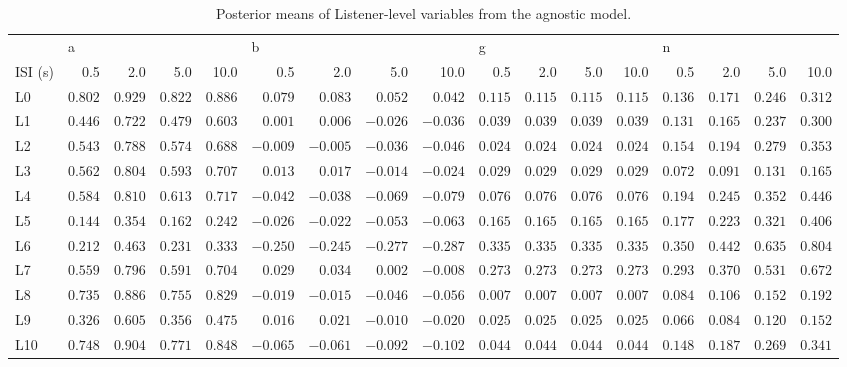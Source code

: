 \begin{table} \centering \caption{Posterior means of Listener-level variables from the agnostic model.} \label{vars} \begin{tabular}{lrrrrrrrrrrrrrrrr} \toprule {} & \multicolumn{4}{l}{a} & \multicolumn{4}{l}{b} & \multicolumn{4}{l}{g} & \multicolumn{4}{l}{n} \\ ISI (s) & 0.5 & 2.0 & 5.0 & 10.0 & 0.5 & 2.0 & 5.0 & 10.0 & 0.5 & 2.0 & 5.0 & 10.0 & 0.5 & 2.0 & 5.0 & 10.0 \\ \midrule L0 & $0.802$ & $0.929$ & $0.822$ & $0.886$ & $0.079$ & $0.083$ & $0.052$ & $0.042$ & $0.115$ & $0.115$ & $0.115$ & $0.115$ & $0.136$ & $0.171$ & $0.246$ & $0.312$ \\ L1 & $0.446$ & $0.722$ & $0.479$ & $0.603$ & $0.001$ & $0.006$ & $-0.026$ & $-0.036$ & $0.039$ & $0.039$ & $0.039$ & $0.039$ & $0.131$ & $0.165$ & $0.237$ & $0.300$ \\ L2 & $0.543$ & $0.788$ & $0.574$ & $0.688$ & $-0.009$ & $-0.005$ & $-0.036$ & $-0.046$ & $0.024$ & $0.024$ & $0.024$ & $0.024$ & $0.154$ & $0.194$ & $0.279$ & $0.353$ \\ L3 & $0.562$ & $0.804$ & $0.593$ & $0.707$ & $0.013$ & $0.017$ & $-0.014$ & $-0.024$ & $0.029$ & $0.029$ & $0.029$ & $0.029$ & $0.072$ & $0.091$ & $0.131$ & $0.165$ \\ L4 & $0.584$ & $0.810$ & $0.613$ & $0.717$ & $-0.042$ & $-0.038$ & $-0.069$ & $-0.079$ & $0.076$ & $0.076$ & $0.076$ & $0.076$ & $0.194$ & $0.245$ & $0.352$ & $0.446$ \\ L5 & $0.144$ & $0.354$ & $0.162$ & $0.242$ & $-0.026$ & $-0.022$ & $-0.053$ & $-0.063$ & $0.165$ & $0.165$ & $0.165$ & $0.165$ & $0.177$ & $0.223$ & $0.321$ & $0.406$ \\ L6 & $0.212$ & $0.463$ & $0.231$ & $0.333$ & $-0.250$ & $-0.245$ & $-0.277$ & $-0.287$ & $0.335$ & $0.335$ & $0.335$ & $0.335$ & $0.350$ & $0.442$ & $0.635$ & $0.804$ \\ L7 & $0.559$ & $0.796$ & $0.591$ & $0.704$ & $0.029$ & $0.034$ & $0.002$ & $-0.008$ & $0.273$ & $0.273$ & $0.273$ & $0.273$ & $0.293$ & $0.370$ & $0.531$ & $0.672$ \\ L8 & $0.735$ & $0.886$ & $0.755$ & $0.829$ & $-0.019$ & $-0.015$ & $-0.046$ & $-0.056$ & $0.007$ & $0.007$ & $0.007$ & $0.007$ & $0.084$ & $0.106$ & $0.152$ & $0.192$ \\ L9 & $0.326$ & $0.605$ & $0.356$ & $0.475$ & $0.016$ & $0.021$ & $-0.010$ & $-0.020$ & $0.025$ & $0.025$ & $0.025$ & $0.025$ & $0.066$ & $0.084$ & $0.120$ & $0.152$ \\ L10 & $0.748$ & $0.904$ & $0.771$ & $0.848$ & $-0.065$ & $-0.061$ & $-0.092$ & $-0.102$ & $0.044$ & $0.044$ & $0.044$ & $0.044$ & $0.148$ & $0.187$ & $0.269$ & $0.341$ \\ \bottomrule \end{tabular} \end{table}